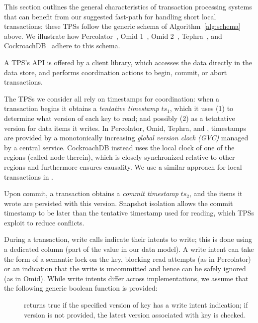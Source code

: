 
This section outlines the general characteristics of transaction processing systems that can benefit from our 
suggested fast-path for handling short local transactions; these TPSs follow the generic schema of Algorithm~\ref{alg:schema} above. 
We illustrate how 
Percolator~\cite{Percolator2010}, Omid 1~\cite{OmidICDE2014}, Omid 2~\cite{omid-blog}, 
Tephra~\cite{tephra}, and CockroachDB~\cite{cockroach} adhere to this schema.

A TPS's API is offered by a client library, which accesses the data directly in the data store, and 
performs coordination actions to begin, commit, or abort transactions. 

The TPSs we consider all rely on timestamps for coordination: when a transaction begins it obtains a \emph{tentative timestamp} $ts_1$, 
which it uses (1) to determine what version of each key to read; and possibly (2) as a tetntative version for data items it writes.   
In Percolator, Omid, Tephra, and \sys, timestamps are provided by a monotonically
increasing \emph{global version  clock (GVC)} managed by a central service. 
CockroachDB instead uses the local clock of
one of the regions (called node therein), which is closely synchronized relative to other regions and furthermore ensures causality.
We use a similar approach for local transactions in \sys.

Upon commit, a transaction obtains a \emph{commit timestamp} $ts_2$, and the items it wrote are persisted with this version.
Snapshot isolation allows the commit timestamp to be later than the tentative timestamp used for reading, 
which TPSs exploit to reduce conflicts.

During a transaction, write calls indicate their intents to write; this is done using
a dedicated column (part of the value in our data model).
A write intent can take the form of a semantic lock on the key, blocking read attempts (as in Percolator) or
an indication that the write is uncommitted and hence can be safely ignored (as in Omid). 
While write intents differ across implementations, we assume that the following generic boolean function is  provided:
\begin{description}
\item[] returns true if the specified version of key has a write intent indication; if version is not provided, the 
latest version associated with key is checked.
\end{description}

